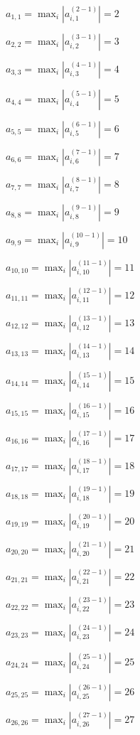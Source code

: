 \documentclass[a4paper,12pt]{article}
\begin{document}
$a _{ 1, 1 } =  \max _i |a _{ i, 1 } ^{ (2 - 1) } | = 2$

$a _{ 2, 2 } =  \max _i |a _{ i, 2 } ^{ (3 - 1) } | = 3$

$a _{ 3, 3 } =  \max _i |a _{ i, 3 } ^{ (4 - 1) } | = 4$

$a _{ 4, 4 } =  \max _i |a _{ i, 4 } ^{ (5 - 1) } | = 5$

$a _{ 5, 5 } =  \max _i |a _{ i, 5 } ^{ (6 - 1) } | = 6$

$a _{ 6, 6 } =  \max _i |a _{ i, 6 } ^{ (7 - 1) } | = 7$

$a _{ 7, 7 } =  \max _i |a _{ i, 7 } ^{ (8 - 1) } | = 8$

$a _{ 8, 8 } =  \max _i |a _{ i, 8 } ^{ (9 - 1) } | = 9$

$a _{ 9, 9 } =  \max _i |a _{ i, 9 } ^{ (10 - 1) } | = 10$

$a _{ 10, 10 } =  \max _i |a _{ i, 10 } ^{ (11 - 1) } | = 11$

$a _{ 11, 11 } =  \max _i |a _{ i, 11 } ^{ (12 - 1) } | = 12$

$a _{ 12, 12 } =  \max _i |a _{ i, 12 } ^{ (13 - 1) } | = 13$

$a _{ 13, 13 } =  \max _i |a _{ i, 13 } ^{ (14 - 1) } | = 14$

$a _{ 14, 14 } =  \max _i |a _{ i, 14 } ^{ (15 - 1) } | = 15$

$a _{ 15, 15 } =  \max _i |a _{ i, 15 } ^{ (16 - 1) } | = 16$

$a _{ 16, 16 } =  \max _i |a _{ i, 16 } ^{ (17 - 1) } | = 17$

$a _{ 17, 17 } =  \max _i |a _{ i, 17 } ^{ (18 - 1) } | = 18$

$a _{ 18, 18 } =  \max _i |a _{ i, 18 } ^{ (19 - 1) } | = 19$

$a _{ 19, 19 } =  \max _i |a _{ i, 19 } ^{ (20 - 1) } | = 20$

$a _{ 20, 20 } =  \max _i |a _{ i, 20 } ^{ (21 - 1) } | = 21$

$a _{ 21, 21 } =  \max _i |a _{ i, 21 } ^{ (22 - 1) } | = 22$

$a _{ 22, 22 } =  \max _i |a _{ i, 22 } ^{ (23 - 1) } | = 23$

$a _{ 23, 23 } =  \max _i |a _{ i, 23 } ^{ (24 - 1) } | = 24$

$a _{ 24, 24 } =  \max _i |a _{ i, 24 } ^{ (25 - 1) } | = 25$

$a _{ 25, 25 } =  \max _i |a _{ i, 25 } ^{ (26 - 1) } | = 26$

$a _{ 26, 26 } =  \max _i |a _{ i, 26 } ^{ (27 - 1) } | = 27$
\end{document}
